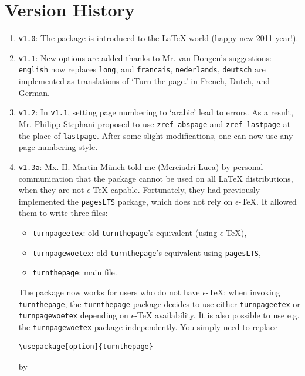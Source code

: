 \documentclass[12pt,a4paper,twoside]{article}
\providecommand{\etex}{$\epsilon$-\TeX}
\begin{document}
\section{Version History\label{sec:vh}}
\begin{enumerate}
\addtocounter{enumi}{-1}
 \item \verb|v1.0|:  The package is introduced to the \LaTeX{} world (happy new 2011 year!).
 \item \verb|v1.1|:  New options are added thanks to Mr. van Dongen's suggestions:
                     \verb|english| now replaces \verb|long|, and \verb|francais|, \verb|nederlands|, \verb|deutsch|
                     are implemented as translations of `Turn the page.' in French, Dutch, and German.
 \item \verb|v1.2|:  In \verb|v1.1|, setting page numbering to `arabic' lead to errors. As a result, Mr. Philipp Stephani
                     proposed to use \verb|zref-abspage| and \verb|zref-lastpage| at the place of \verb|lastpage|.
                     After some slight modifications, one can now use any page numbering style.
 \item \verb|v1.3a|: Mx. H.-Martin M\"unch told me (Merciadri Luca) by personal communication that the package
                     cannot be used on all \LaTeX{} distributions, when they are not \etex{} capable. Fortunately,
                     they had previously implemented the \verb|pagesLTS| package, which does not rely on \etex.
                     It allowed them to write three files:
\begin{itemize}
 \item \verb|turnpageetex|: old \verb|turnthepage|'s equivalent (using \etex),
 \item \verb|turnpagewoetex|: old \verb|turnthepage|'s equivalent using \verb|pagesLTS|,
 \item \verb|turnthepage|: main file.
\end{itemize}
                     The package now works for users who do not have \etex: when invoking \verb|turnthepage|,
                     the \verb|turnthepage| package decides to use either \verb|turnpageetex| or  \verb|turnpagewoetex|
                     depending on \etex{} availability. It is also possible to use e.g. the \verb|turnpagewoetex| package
                     independently. You simply need to replace
\begin{verbatim}
\usepackage[option]{turnthepage}
\end{verbatim}
                     by
\begin{verbatim}

\end{verbatim}
\end{enumerate}
\end{document}
